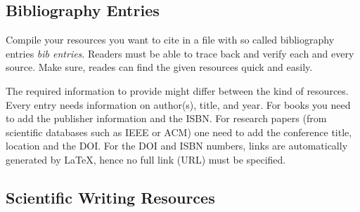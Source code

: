 \subsection{Bibliography Entries}

Compile your resources you want to cite in a file with so called bibliography 
entries \emph{bib entries}. 
Readers must be able to trace back and verify each and every source. 
Make sure, reades can find the given resources quick and easily. 

The required information to provide might differ between the kind of resources.
Every entry needs information on author(s), title, and year.
For books you need to add the publisher information and the ISBN.
For research papers (from scientific databases such as IEEE or ACM)
one need to add the conference title, location and the \ac{DOI}.
For the DOI and \ac{ISBN} numbers, links are automatically generated by \LaTeX, 
hence no full link (\ac{URL}) must be specified.  

\subsection{Scientific Writing Resources}


